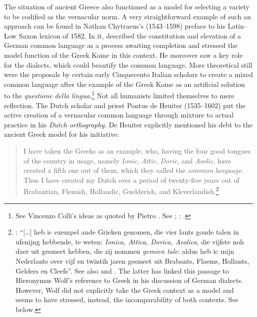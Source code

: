 The situation of ancient Greece also functioned as a model for selecting a variety to be codified as the vernacular norm. A very straightforward example of such an approach can be found in Nathan Chytraeus’s (1543–1598) preface to his Latin–Low Saxon lexicon of 1582. In it, \citet[\textsc{a.3}\textsc{\textsuperscript{r}}\textsc{–a.3}\textsc{\textsuperscript{v}}]{Chytraeus1582} described the constitution and elevation of a German common language as a process awaiting completion and stressed the model function of the Greek Koine in this context. He moreover saw a key role for the dialects, which could beautify the common language. More theoretical still were the proposals by certain early Cinquecento Italian scholars to create a mixed common language after the example of the Greek Koine as an artificial solution to the \textit{questione della lingua}.\footnote{See Vincenzo Colli’s ideas as quoted by Pietro \citet[\textsc{xii}\textsc{\textsuperscript{v}}\textsc{–xiii}\textsc{\textsuperscript{r}}]{Bembo1525}. See \citet[119]{Melzi1966}; \citet[215--218]{Trovato1984}; \citet[12]{Trapp1990}.} Not all humanists limited themselves to mere reflection. The Dutch scholar and priest Pontus de Heuiter (1535–1602) put the active creation of a vernacular common language through mixture to actual practice in his \textit{Dutch orthography}. De Heuiter explicitly mentioned his debt to the ancient Greek model for his initiative:

\begin{quote}
I have taken the Greeks as an example, who, having the four good tongues of the country in usage, namely \textit{Ionic}, \textit{Attic}, \textit{Doric}, and \textit{Aeolic}, have created a fifth one out of them, which they called the \textit{common language}. Thus I have created my Dutch over a period of twenty-five years out of Brabantian, Flemish, Hollandic, Guelderish, and Kleverlandish.\footnote{: “[…] heb ic exempel ande Grieken genomen, die vier lants goude talen in ufenijng hebbende, te weten: \textit{Ionica, Attica, Dorica, Aeolica}, die vijfste noh daer uit gesmeet hebben, die zij nommen \textit{gemeen tale}: aldus heb ic mijn Nederlants over vijf en twintih jaren gesmeet uit Brabants, Flaems, Hollants, Gelders en Cleefs”. See also \citet[110]{Dibbets2008} and \citet[13--14]{De1917}. The latter has linked this passage to Hieronymus Wolf’s reference to Greek in his discussion of German dialects. However, Wolf did not explicitly take the Greek context as a model and seems to have stressed, instead, the incomparability of both contexts. See  below.}
\end{quote}

